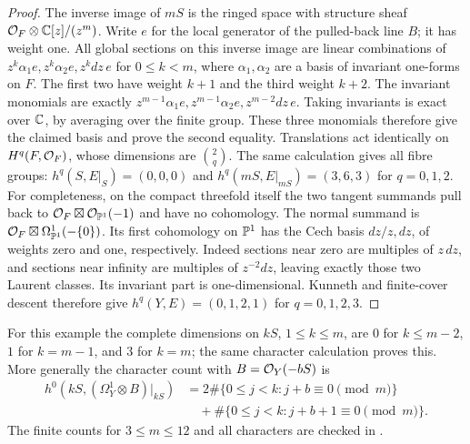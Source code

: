 \begin{proof}
The inverse image of $mS$ is the ringed space with structure sheaf $\mathcal O_F\otimes\mathbb C[z]/(z^m)$. Write $e$ for the local generator of the pulled-back line $B$; it has weight one. All global sections on this inverse image are linear combinations of $z^k\alpha_1e,z^k\alpha_2e,z^kdz\,e$ for $0\le k<m$, where $\alpha_1,\alpha_2$ are a basis of invariant one-forms on $F$. The first two have weight $k+1$ and the third weight $k+2$. The invariant monomials are exactly
$z^{m-1}\alpha_1e,z^{m-1}\alpha_2e,z^{m-2}dz\,e$.
Taking invariants is exact over $\mathbb C$, by averaging over the finite group. These three monomials therefore give the claimed basis and prove the second equality. Translations act identically on $H^q(F,\mathcal O_F)$, whose dimensions are $\binom{2}{q}$. The same calculation gives all fibre groups: $h^q(S,E|_S)=(0,0,0)$ and $h^q(mS,E|_{mS})=(3,6,3)$ for $q=0,1,2$. For completeness, on the compact threefold itself the two tangent summands pull back to $\mathcal O_F\boxtimes\mathcal O_{\mathbb P^1}(-1)$ and have no cohomology. The normal summand is $\mathcal O_F\boxtimes\Omega^1_{\mathbb P^1}(-\{0\})$. Its first cohomology on $\mathbb P^1$ has the Cech basis $dz/z,dz$, of weights zero and one, respectively. Indeed sections near zero are multiples of $z\,dz$, and sections near infinity are multiples of $z^{-2}dz$, leaving exactly those two Laurent classes. Its invariant part is one-dimensional. Kunneth and finite-cover descent therefore give $h^q(Y,E)=(0,1,2,1)$ for $q=0,1,2,3$.
\end{proof}

For this example the complete dimensions on $kS$, $1\le k\le m$, are $0$ for $k\le m-2$, $1$ for $k=m-1$, and $3$ for $k=m$; the same character calculation proves this. More generally the character count with $B=\mathcal O_Y(-bS)$ is
\[
\begin{aligned}
h^0(kS,(\Omega_Y^1\otimes B)|_{kS})
&=2\#\{0\le j<k:j+b\equiv0\pmod m\}\\
&\quad+\#\{0\le j<k:j+b+1\equiv0\pmod m\}.
\end{aligned}
\tag{A.13}
\]
The finite counts for $3\le m\le12$ and all characters are checked in .



